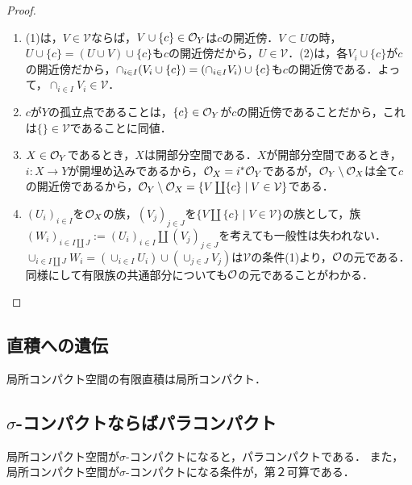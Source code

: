\documentclass[uplatex,dvipdfmx]{jsreport}
\begin{document}
\begin{proof}\mbox{}
    \begin{enumerate}
        \item (1)は，$V\in\mathcal{V}$ならば，$V\cup\{c\}\in\mathcal{O}_Y$は$c$の開近傍．$V\subset U$の時，$U\cup\{c\}=(U\cup V)\cup\{c\}$も$c$の開近傍だから，$U\in\mathcal{V}$．(2)は，各$V_i\cup\{c\}$が$c$の開近傍だから，$\cap_{i\in I}(V_i\cup\{c\})=\left(\cap_{i\in I}V_i\right)\cup\{c\}$も$c$の開近傍である．よって，$\cap_{i\in I}V_i\in\mathcal{V}$．
        \item $c$が$Y$の孤立点であることは，$\{c\}\in\mathcal{O}_Y$が$c$の開近傍であることだから，これは$\{\}\in\mathcal{V}$であることに同値．
        \item $X\in\mathcal{O}_Y$であるとき，$X$は開部分空間である．$X$が開部分空間であるとき，$i:X\to Y$が開埋め込みであるから，$\mathcal{O}_X=i^*\mathcal{O}_Y$であるが，$\mathcal{O}_Y\setminus\mathcal{O}_X$は全て$c$の開近傍であるから，$\mathcal{O}_Y\setminus\mathcal{O}_X=\{V\coprod\{c\}\mid V\in\mathcal{V}\}$である．
        \item $(U_i)_{i\in I}$を$\mathcal{O}_X$の族，$(V_j)_{j\in J}$を$\{V\coprod\{c\}\mid V\in\mathcal{V}\}$の族として，族$(W_i)_{i\in I\coprod J}:=(U_i)_{i\in I}\coprod(V_j)_{j\in J}$を考えても一般性は失われない．$\cup_{i\in I\coprod J}W_i=(\cup_{i\in I}U_i)\cup(\cup_{j\in J}V_j)$は$\mathcal{V}$の条件(1)より，$\mathcal{O}$の元である．同様にして有限族の共通部分についても$\mathcal{O}$の元であることがわかる．
    \end{enumerate}
\end{proof}

\subsection{直積への遺伝}

\begin{proposition}
    局所コンパクト空間の有限直積は局所コンパクト．
\end{proposition}



\subsection{$\sigma$-コンパクトならばパラコンパクト}

\begin{tcolorbox}[colframe=ForestGreen, colback=ForestGreen!10!white,breakable,colbacktitle=ForestGreen!40!white,coltitle=black,fonttitle=\bfseries\sffamily,
title=]
    局所コンパクト空間が$\sigma$-コンパクトになると，パラコンパクトである．
    また，局所コンパクト空間が$\sigma$-コンパクトになる条件が，第２可算である．
\end{tcolorbox}
\end{document}
